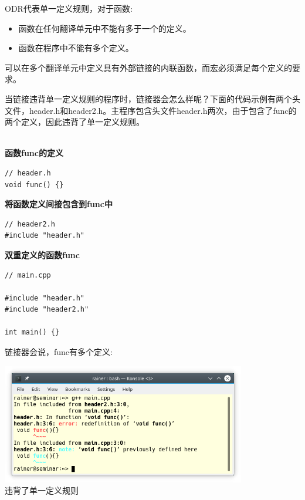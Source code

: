ODR代表单一定义规则，对于函数:

\begin{itemize}
\item 
函数在任何翻译单元中不能有多于一个的定义。

\item 
函数在程序中不能有多个定义。
\end{itemize}

可以在多个翻译单元中定义具有外部链接的内联函数，而宏必须满足每个定义的要求。

当链接违背单一定义规则的程序时，链接器会怎么样呢？下面的代码示例有两个头文件，header.h和header2.h。主程序包含头文件header.h两次，由于包含了func的两个定义，因此违背了单一定义规则。

\hspace*{\fill} \\ %
\noindent
\textbf{函数func的定义}
\begin{lstlisting}[style=styleCXX]
// header.h
void func() {}
\end{lstlisting}

\noindent
\textbf{将函数定义间接包含到func中}
\begin{lstlisting}[style=styleCXX]
// header2.h
#include "header.h"
\end{lstlisting}

\noindent
\textbf{双重定义的函数func}
\begin{lstlisting}[style=styleCXX]
// main.cpp

#include "header.h"
#include "header2.h"

int main() {}
\end{lstlisting}

链接器会说，func有多个定义:

\begin{center}
\includegraphics[width=0.8\textwidth]{content/3/chapter4/images/16.png}\\
违背了单一定义规则
\end{center}

